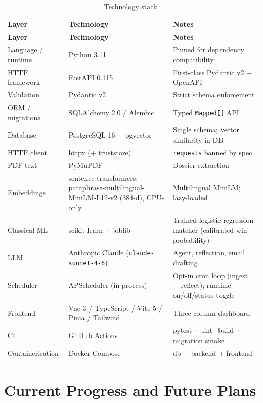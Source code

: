 {\small\renewcommand{\arraystretch}{1.1}%
\begin{xltabular}{\textwidth}{@{}>{\raggedright\arraybackslash}p{2.5cm} >{\raggedright\arraybackslash}p{4.9cm} >{\raggedright\arraybackslash}X@{}}
\caption[Technology stack]{Technology stack.}\label{tab:tech}\\
\toprule
\textbf{Layer} & \textbf{Technology} & \textbf{Notes}\\
\midrule
\endfirsthead
\toprule
\textbf{Layer} & \textbf{Technology} & \textbf{Notes}\\
\midrule
\endhead
\bottomrule
\endlastfoot
Language / runtime & Python 3.11 & Pinned for dependency compatibility\\
HTTP framework & FastAPI 0.115 & First-class Pydantic v2 + OpenAPI\\
Validation & Pydantic v2 & Strict schema enforcement\\
ORM / migrations & SQLAlchemy 2.0 / Alembic & Typed \texttt{Mapped[]} API\\
Database & PostgreSQL 16 + pgvector & Single schema; vector similarity in-DB\\
HTTP client & httpx (+ truststore) & \texttt{requests} banned by spec\\
PDF text & PyMuPDF & Dossier extraction\\
Embeddings & sentence-transformers: paraphrase-multilingual-MiniLM-L12-v2 (384-d), CPU-only & Multilingual MiniLM; lazy-loaded\\
Classical ML & scikit-learn + joblib & Trained logistic-regression matcher (calibrated win-probability)\\
LLM & Anthropic Claude (\texttt{claude-sonnet-4-6}) & Agent, reflection, email drafting\\
Scheduler & APScheduler (in-process) & Opt-in cron loop (ingest + reflect); runtime on/off/status toggle\\
Frontend & Vue 3 / TypeScript / Vite 5 / Pinia / Tailwind & Three-column dashboard\\
CI & GitHub Actions & pytest · lint+build · migration smoke\\
Containerisation & Docker Compose & db + backend + frontend\\
\end{xltabular}}

\section{Current Progress and Future Plans}

